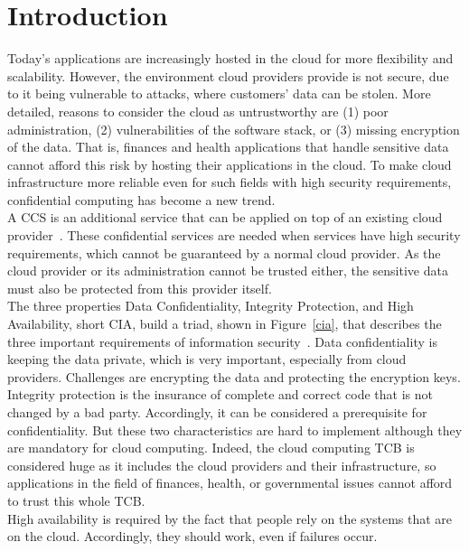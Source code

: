 


\section{Introduction}
Today's applications are increasingly hosted in the cloud for more flexibility and scalability. However, the environment cloud providers provide is not secure, due to it being vulnerable to attacks, where customers' data can be stolen. More detailed, reasons to consider the cloud as untrustworthy are (1) poor administration, (2) vulnerabilities of the software stack, or (3) missing encryption of the data.
  That is, finances and health applications that handle sensitive data cannot afford this risk by hosting their applications in the cloud. To make cloud infrastructure more reliable even for such fields with high security requirements, confidential computing has become a new trend.\\
 A CCS is an additional service that can be applied on top of an existing cloud provider~\cite{confidentiality}. These confidential services are needed when services have high security requirements, which cannot be guaranteed by a normal cloud provider. As the cloud provider or its administration cannot be trusted either, the sensitive data must also be protected from this provider itself. \\
 The three properties Data Confidentiality, Integrity Protection, and High Availability, short CIA, build a triad,  shown in Figure~\ref{cia},  that describes the three important requirements of information security~\cite{ciaBook, cia}. Data confidentiality is keeping the data private, which is very important, especially from cloud providers. Challenges are encrypting the data and protecting the encryption keys.\\
 Integrity protection is the insurance of complete and correct code that is not changed by a bad party. Accordingly, it can be considered a prerequisite for confidentiality. But these two characteristics are hard to implement although they are mandatory for cloud computing. Indeed, the cloud computing TCB  is considered huge as it includes the cloud providers and their infrastructure, so applications in the field of finances, health, or governmental issues cannot afford to trust this whole TCB.\\
 High availability is required by the fact that people rely on the systems that are on the cloud. Accordingly, they should work, even if failures occur.\\

